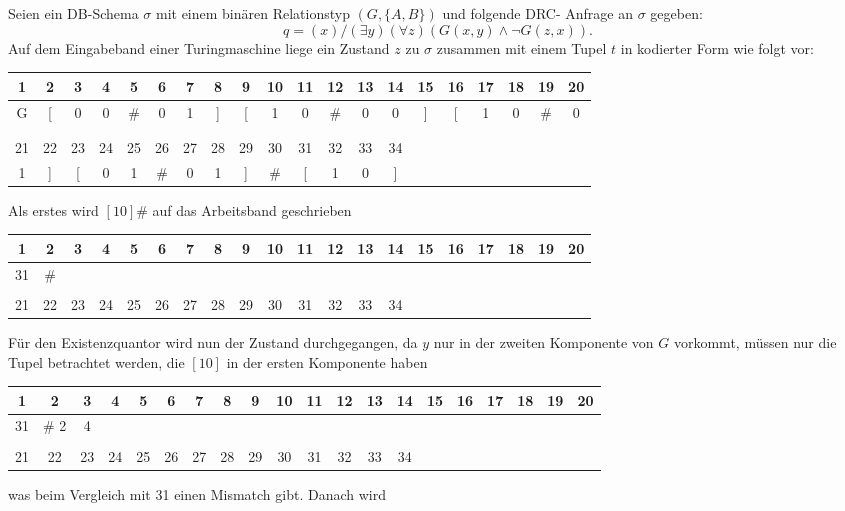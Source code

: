 \documentclass[12pt,a4paper]{amsart}
\begin{document}
\begin{aufgabe1}
Seien ein DB-Schema $\sigma$ mit einem binären Relationstyp $(G,\{A, B\})$ und folgende DRC-
Anfrage an $\sigma$ gegeben:
\[
q = (x)/(\exists y)(\forall z)(G(x, y) \land \lnot G(z, x)).
\]
Auf dem Eingabeband einer Turingmaschine liege ein Zustand $z$ zu $\sigma$ zusammen mit einem
Tupel $t$ in kodierter Form wie folgt vor:
{\tiny
\begin{center}
\begin{tabular}{cccccccccccccccccccc}
1 & 2 & 3 & 4 & 5 & 6 & 7 & 8 & 9 & 10 & 11 & 12 & 13 & 14 & 15 & 16 & 17 & 18 & 19 & 20\\ \hline
G&[&0&0&\#&0&1&]&[&1&0&\#&0&0&]&[&1&0&\#&0\\ \\ \hline \hline \\ 
21 & 22 & 23 & 24 & 25 & 26 & 27 & 28 & 29 & 30 & 31 & 32 & 33 & 34 \\ \hline
1&]&[&0&1&\#&0&1&]&\#&[&1&0&]
\end{tabular}
\end{center}
}
Als erstes wird $[10]\#$ auf das Arbeitsband geschrieben
{\tiny
\begin{center}
\begin{tabular}{cccccccccccccccccccc}
1 & 2 & 3 & 4 & 5 & 6 & 7 & 8 & 9 & 10 & 11 & 12 & 13 & 14 & 15 & 16 & 17 & 18 & 19 & 20\\ \hline
31 & \# \\ \hline \hline \\ 
21 & 22 & 23 & 24 & 25 & 26 & 27 & 28 & 29 & 30 & 31 & 32 & 33 & 34 \\ \hline
\end{tabular}
\end{center}
}
Für den Existenzquantor wird nun der Zustand durchgegangen, da $y$ nur in der zweiten Komponente von $G$ vorkommt, müssen nur die Tupel betrachtet werden, die
$[10]$ in der ersten Komponente haben
{\tiny
\begin{center}
\begin{tabular}{cccccccccccccccccccc}
1 & 2 & 3 & 4 & 5 & 6 & 7 & 8 & 9 & 10 & 11 & 12 & 13 & 14 & 15 & 16 & 17 & 18 & 19 & 20\\ \hline
31 & \# 2& 4 \\ \hline \hline \\ 
21 & 22 & 23 & 24 & 25 & 26 & 27 & 28 & 29 & 30 & 31 & 32 & 33 & 34 \\ \hline
\end{tabular}
\end{center}
}
was beim Vergleich mit 31 einen Mismatch gibt. Danach wird

\end{aufgabe1}
\end{document}
